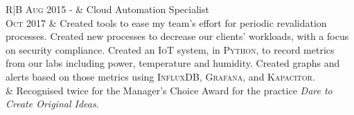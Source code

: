 \documentclass[letterpaper,10pt]{article}
\begin{document}
\begin{tabular}{R|B}
	\textsc{Aug} 2015 -           & Cloud Automation Specialist                                                                                            \\
	\textsc{Oct} 2017\phantom{ -}
	                              & \footnotesize Created tools to ease my team's effort for periodic revalidation processes.
	Created new processes to decrease our clients' workloads, with a focus on security compliance. Created an \textsc{IoT} system,
	in \textsc{Python}, to record metrics from our labs including power, temperature and humidity. Created graphs and alerts based
	on those metrics using \textsc{InfluxDB}, \textsc{Grafana}, and \textsc{Kapacitor}.                                                                    \\
	                              & \footnotesize Recognised twice for the Manager's Choice Award for the practice \emph{Dare to Create Original Ideas}.   \\
	                                                                                                                                   \\
\end{tabular}

\end{document}
